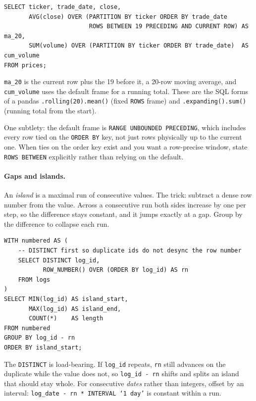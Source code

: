 \begin{lstlisting}[style=sql, caption={20-day moving average and running volume}]
SELECT ticker, trade_date, close,
       AVG(close) OVER (PARTITION BY ticker ORDER BY trade_date
                        ROWS BETWEEN 19 PRECEDING AND CURRENT ROW) AS ma_20,
       SUM(volume) OVER (PARTITION BY ticker ORDER BY trade_date)  AS cum_volume
FROM prices;
\end{lstlisting}

\texttt{ma\_20} is the current row plus the 19 before it, a 20-row moving
average, and \texttt{cum\_volume} uses the default frame for a running total.
These are the SQL forms of a pandas \texttt{.rolling(20).mean()} (fixed
\texttt{ROWS} frame) and \texttt{.expanding().sum()} (running total from the
start).

One subtlety: the default frame is \texttt{RANGE UNBOUNDED PRECEDING}, which
includes every row tied on the \texttt{ORDER BY} key, not just rows physically
up to the current one. When ties on the order key exist and you want a
row-precise window, state \texttt{ROWS BETWEEN} explicitly rather than relying
on the default.

\paragraph{Gaps and islands.} An \emph{island} is a maximal run of consecutive
values. The trick: subtract a dense row number from the value. Across a
consecutive run both sides increase by one per step, so the difference stays
constant, and it jumps exactly at a gap. Group by the difference to collapse
each run.

\begin{lstlisting}[style=sql, caption={Islands of consecutive ids}]
WITH numbered AS (
    -- DISTINCT first so duplicate ids do not desync the row number
    SELECT DISTINCT log_id,
           ROW_NUMBER() OVER (ORDER BY log_id) AS rn
    FROM logs
)
SELECT MIN(log_id) AS island_start,
       MAX(log_id) AS island_end,
       COUNT(*)    AS length
FROM numbered
GROUP BY log_id - rn
ORDER BY island_start;
\end{lstlisting}

The \texttt{DISTINCT} is load-bearing. If \texttt{log\_id} repeats, \texttt{rn}
still advances on the duplicate while the value does not, so
\texttt{log\_id - rn} shifts and splits an island that should stay whole. For
consecutive \emph{dates} rather than integers, offset by an interval:
\texttt{log\_date - rn * INTERVAL `1 day'} is constant within a run.

